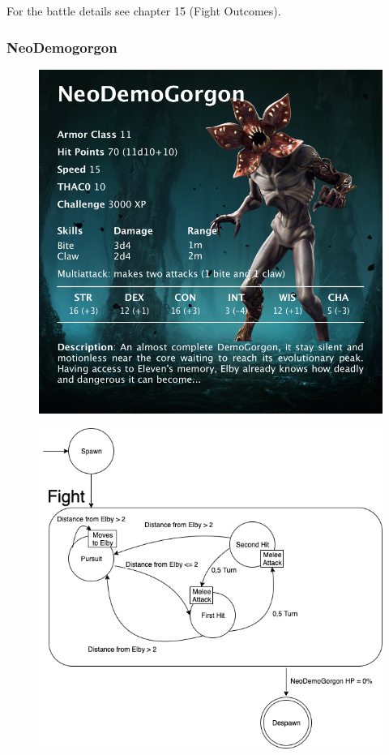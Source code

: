 For the battle details see chapter 15 (Fight Outcomes).
\newpage



\subsubsection{NeoDemogorgon}
\vspace*{0.3cm}
\begin{figure}[H]
	\centering
	\includegraphics[width=0.9\linewidth]{images/visual_stats/neodemogorgon.png}
\end{figure}
\newpage
\begin{figure}[H]
	\centering
	\includegraphics[width=0.8\linewidth]{images/graphs/fsa/fsa_neodemogorgon.png}
\end{figure}


